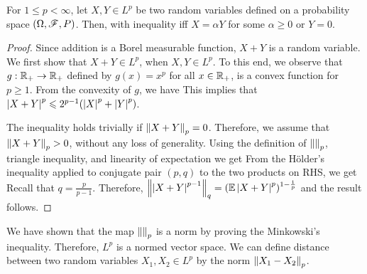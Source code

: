 \documentclass[letterpaper,10pt,english]{article}
\begin{document}
\begin{thm} 
For $1 \le p < \infty$, let $X,Y\in L^p$ be two random variables defined on a probability space $(\Omega, \mathscr{F}, P)$. 
Then, 
with inequality iff $X = \alpha Y$ for some $\alpha \ge 0$ or $Y = 0$. 
\end{thm}
\begin{proof}
Since addition is a Borel measurable function, $X+Y$ is a random variable. 
We first show that $X+Y \in L^p$, when $X,Y \in L^p$.  
To this end, we observe that $g:\mathbb{R}_+\to\mathbb{R}_+$ defined by $g(x)= x^p$ for all $x \in \mathbb{R}_+$, 
is a convex function for $p \ge 1$. 
From the convexity of $g$, we have 
This implies that $\left\lvert X+Y\right\rvert^p \leqslant 2^{p-1}(\left\lvert X\right\rvert^p + \left\lvert Y\right\rvert^p)$. 

The inequality holds trivially if $\left\lVert X+Y\right\rVert_p = 0$. 
Therefore, we assume that $\left\lVert X+Y\right\rVert_p > 0$, without any loss of generality. 
Using the definition of $\left\lVert\right\rVert_p$, triangle inequality, 
and linearity of expectation 
we get 
From the H\"older's inequality applied to conjugate pair $(p,q)$ to the two products on RHS, we get 
Recall that $q = \frac{p}{p-1}$. %
Therefore, $\left\lVert\left\lvert X+Y\right\rvert^{p-1}\right\rVert_q = (\mathbb{E}\left\lvert X+Y\right\rvert^p)^{1-\frac{1}{p}}$ and the result follows.
\end{proof}


\begin{rem}
We have shown that the map $\left\lVert\right\rVert_p$ is a norm by proving the Minkowski's inequality. 
Therefore, $L^p$ is a normed vector space.    
We can define distance between two random variables $X_1, X_2 \in L^p$ by the norm $\left\lVert X_1-X_2\right\rVert_p$. 
\end{rem}
\end{document}
